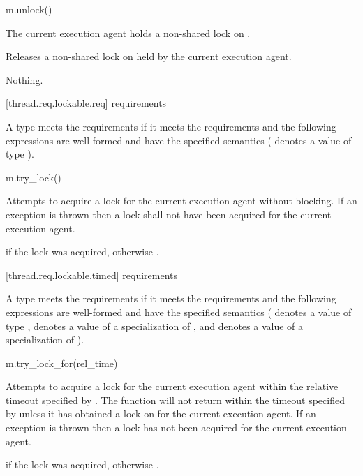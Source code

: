 \begin{itemdecl}
m.unlock()
\end{itemdecl}

\begin{itemdescr}
\pnum
\expects
The current execution agent holds a non-shared lock on .

\pnum
\effects
Releases a non-shared lock on  held by the current execution agent.

\pnum
\throws
Nothing.
\end{itemdescr}

[thread.req.lockable.req]{ requirements}

\pnum
A type  meets the  requirements if it meets the 
requirements and the following expressions are well-formed and have the specified semantics
( denotes a value of type ).

\begin{itemdecl}
m.try_lock()
\end{itemdecl}

\begin{itemdescr}
\pnum
\effects
Attempts to acquire a lock for the current execution agent without blocking. If an
exception is thrown then a lock shall not have been acquired for the current execution agent.

\pnum
\result
{}

\pnum
\returns
{} if the lock was acquired, otherwise .
\end{itemdescr}

[thread.req.lockable.timed]{ requirements}

\pnum
A type  meets the  requirements if it meets the 
requirements and the following expressions are well-formed and have the specified semantics
( denotes a value of type ,  denotes a value of a
specialization of , and  denotes a value
of a specialization of ).

\begin{itemdecl}
m.try_lock_for(rel_time)
\end{itemdecl}

\begin{itemdescr}
\pnum
\effects
Attempts to acquire a lock for the current execution agent within the relative
timeout specified by . The function will not return
within the timeout specified by  unless it has obtained a lock on 
for the current execution agent. If an exception is thrown then a lock has not been
acquired for the current execution agent.

\pnum
\result
{}

\pnum
\returns
{} if the lock was acquired, otherwise .
\end{itemdescr}

